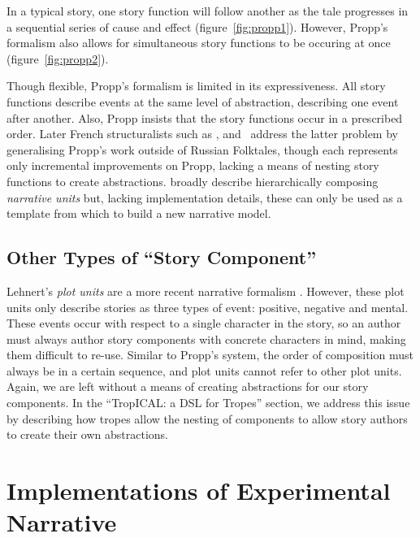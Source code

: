 \documentclass[11pt]{report}
\begin{document}
In a typical story, one story function will follow another as the tale progresses in a sequential series of cause and effect (figure~\ref{fig:propp1}). However, Propp's formalism also allows for simultaneous story functions to be occuring at once (figure~\ref{fig:propp2}).

Though flexible, Propp's formalism is limited in its expressiveness. All story functions describe events at the same level of abstraction, describing one event after another. Also, Propp insists that the story functions occur in a prescribed order. Later French structuralists such as \citet{bremond1980logic}, \citet{greimas1983structural} and~\citet{todorov1969grammaire} address the latter problem by generalising Propp's work outside of Russian Folktales, though each represents only incremental improvements on Propp, lacking a means of nesting story functions to create abstractions. \citet{barthes1975introduction} broadly describe hierarchically composing \emph{narrative units} but, lacking implementation details, these can only be used as a template from which to build a new narrative model.


\subsection{Other Types of ``Story Component''}
Lehnert's \emph{plot units} are a more recent narrative formalism
\citep{lehnert1981plot}. However, these plot units only describe stories as three
types of event: positive, negative and mental. These events occur with respect
to a single character in the story, so an author must always author story
components with concrete characters in mind, making them difficult to re-use.
Similar to Propp's system, the order of composition must always be in a certain
sequence, and plot units cannot refer to other plot units. Again, we are left
without a means of creating abstractions for our story components. In the
``TropICAL: a DSL for Tropes'' section, we address this issue by describing how tropes allow the nesting of components to allow story authors to create their own abstractions.

\section{Implementations of Experimental Narrative}
\label{sec:implementations}
\end{document}
